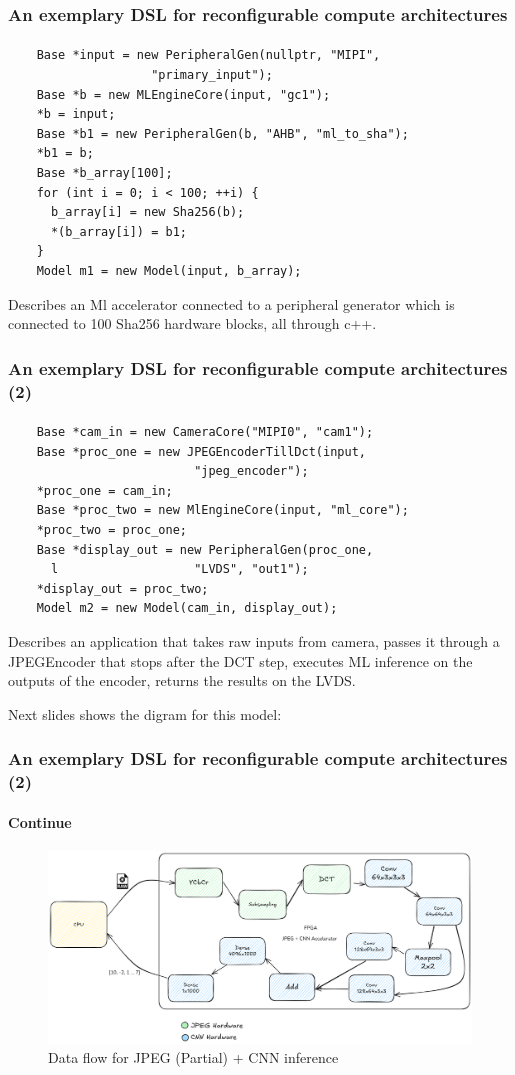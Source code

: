 \documentclass{beamer}
\begin{document}
\begin{frame}[fragile]
  \frametitle{An exemplary DSL for reconfigurable compute architectures}
\framesubtitle{}
  \begin{verbatim}
    Base *input = new PeripheralGen(nullptr, "MIPI", 
                    "primary_input");
    Base *b = new MLEngineCore(input, "gc1");
    *b = input;
    Base *b1 = new PeripheralGen(b, "AHB", "ml_to_sha");
    *b1 = b;
    Base *b_array[100];
    for (int i = 0; i < 100; ++i) {
      b_array[i] = new Sha256(b);
      *(b_array[i]) = b1;
    }
    Model m1 = new Model(input, b_array);
  \end{verbatim}

  Describes an Ml accelerator connected to a peripheral generator
  which is connected to 100 Sha256 hardware blocks, all through c++.
\end{frame}

\begin{frame}[fragile]
  \frametitle{An exemplary DSL for reconfigurable compute architectures (2)}
\framesubtitle{}
  \begin{verbatim}
    Base *cam_in = new CameraCore("MIPI0", "cam1");
    Base *proc_one = new JPEGEncoderTillDct(input, 
                          "jpeg_encoder");
    *proc_one = cam_in;
    Base *proc_two = new MlEngineCore(input, "ml_core");
    *proc_two = proc_one;
    Base *display_out = new PeripheralGen(proc_one, 
      l                   "LVDS", "out1");
    *display_out = proc_two;
    Model m2 = new Model(cam_in, display_out);
  \end{verbatim}
  Describes an application that takes raw inputs from camera, passes it through
  a JPEGEncoder that stops after the DCT step, executes ML inference on the
  outputs of the encoder, returns the results on the LVDS.

  Next slides shows the digram for this model:

\end{frame}

\begin{frame}[fragile]
  \frametitle{An exemplary DSL for reconfigurable compute architectures (2)}
\framesubtitle{Continue}
   \begin{figure}
        \centering
        \includegraphics[width=1\linewidth]{flowcnnjpeg.png}
        \caption{Data flow for JPEG (Partial) + CNN inference}
    \end{figure}
\end{frame}
\end{document}
